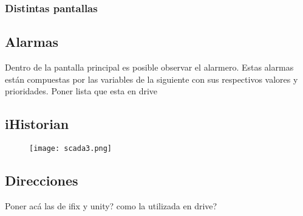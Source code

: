 \subsubsection{Distintas pantallas}


\subsection{Alarmas}
Dentro de la pantalla principal es posible observar el alarmero. Estas alarmas están compuestas por las variables de la siguiente  con sus respectivos valores y prioridades.
Poner lista que esta en drive
\subsection{iHistorian}
\begin{figure}[htb]
	\centering
	\texttt{[image: scada3.png]}
	\label{fig:scada3}
\end{figure}

\subsection{Direcciones}
Poner acá las de ifix y unity? como la utilizada en drive?